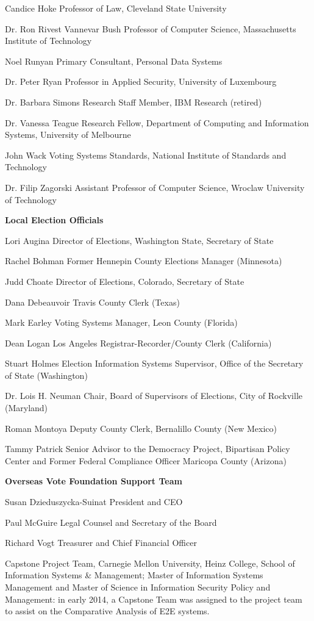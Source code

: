 Candice Hoke
Professor of Law, Cleveland State University
 
Dr. Ron Rivest
Vannevar Bush Professor of Computer Science, Massachusetts Institute of Technology
 
Noel Runyan
Primary Consultant, Personal Data Systems
 
Dr. Peter Ryan
Professor in Applied Security, University of Luxembourg
 
Dr. Barbara Simons
Research Staff Member, IBM Research (retired)
 
Dr. Vanessa Teague
Research Fellow, Department of Computing and Information Systems, University of Melbourne
 
John Wack
Voting Systems Standards, National Institute of Standards and Technology
 
Dr. Filip Zagorski
Assistant Professor of Computer Science, Wroclaw University of Technology
 
\textbf{Local Election Officials}

Lori Augina
Director of Elections, Washington State, Secretary of State

Rachel Bohman
Former Hennepin County Elections Manager (Minnesota)

Judd Choate
Director of Elections, Colorado, Secretary of State

Dana Debeauvoir
Travis County Clerk (Texas)
 
Mark Earley
Voting Systems Manager, Leon County (Florida)
 
Dean Logan
Los Angeles Registrar-Recorder/County Clerk (California)

Stuart Holmes
Election Information Systems Supervisor, Office of the Secretary of State (Washington)
 
Dr. Lois H. Neuman
Chair, Board of Supervisors of Elections, City of Rockville (Maryland)
 
Roman Montoya
Deputy County Clerk, Bernalillo County (New Mexico)
 
Tammy Patrick
Senior Advisor to the Democracy Project, Bipartisan Policy Center and Former Federal Compliance Officer Maricopa County (Arizona)
 
\textbf{Overseas Vote Foundation Support Team}

Susan Dzieduszycka-Suinat
President and CEO
 
Paul McGuire
Legal Counsel and Secretary of the Board
 
Richard Vogt
Treasurer and Chief Financial Officer

Capstone Project Team, Carnegie Mellon University, Heinz College,
School of Information Systems \& Management; Master of Information
Systems Management and Master of Science in Information Security
Policy and Management: in early 2014, a Capstone Team was assigned to
the project team to assist on the Comparative Analysis of E2E systems.

